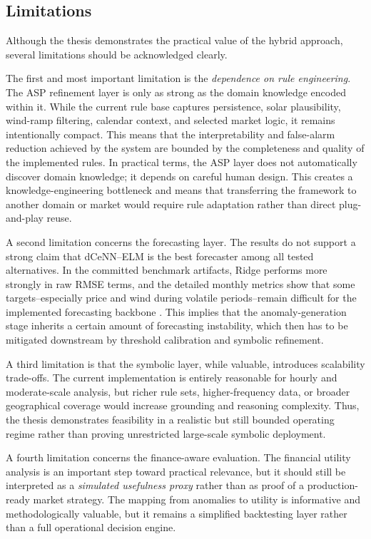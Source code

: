 \subsection{Limitations}
\label{subsec:limitations}

Although the thesis demonstrates the practical value of the hybrid approach, several limitations should be acknowledged clearly.

The first and most important limitation is the \emph{dependence on rule engineering}. The ASP refinement layer is only as strong as the domain knowledge encoded within it. While the current rule base captures persistence, solar plausibility, wind-ramp filtering, calendar context, and selected market logic, it remains intentionally compact. This means that the interpretability and false-alarm reduction achieved by the system are bounded by the completeness and quality of the implemented rules. In practical terms, the ASP layer does not automatically discover domain knowledge; it depends on careful human design. This creates a knowledge-engineering bottleneck and means that transferring the framework to another domain or market would require rule adaptation rather than direct plug-and-play reuse.

A second limitation concerns the forecasting layer. The results do not support a strong claim that dCeNN--ELM is the best forecaster among all tested alternatives. In the committed benchmark artifacts, Ridge performs more strongly in raw RMSE terms, and the detailed monthly metrics show that some targets--especially price and wind during volatile periods--remain difficult for the implemented forecasting backbone \cite{repo_thesis_grid_anomaly}. This implies that the anomaly-generation stage inherits a certain amount of forecasting instability, which then has to be mitigated downstream by threshold calibration and symbolic refinement.

A third limitation is that the symbolic layer, while valuable, introduces scalability trade-offs. The current implementation is entirely reasonable for hourly and moderate-scale analysis, but richer rule sets, higher-frequency data, or broader geographical coverage would increase grounding and reasoning complexity. Thus, the thesis demonstrates feasibility in a realistic but still bounded operating regime rather than proving unrestricted large-scale symbolic deployment.

A fourth limitation concerns the finance-aware evaluation. The financial utility analysis is an important step toward practical relevance, but it should still be interpreted as a \emph{simulated usefulness proxy} rather than as proof of a production-ready market strategy. The mapping from anomalies to utility is informative and methodologically valuable, but it remains a simplified backtesting layer rather than a full operational decision engine.

